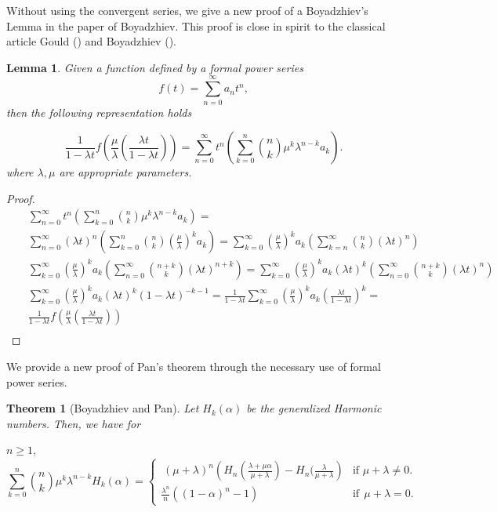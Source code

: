 \documentclass[a4paper,10pt,oneside]{article}
\newtheorem{lemma}{Lemma}[section]
\newtheorem{theorem}{Theorem}[section]
\theoremstyle{definition}
\theoremstyle{remark}
\begin{document}
 Without using the convergent series, we give a new proof of a Boyadzhiev's Lemma in the paper of  Boyadzhiev\cite{khristo3}. This proof is close in spirit to the classical article Gould (\cite{gould}) and   Boyadzhiev (\cite{khristo3}).\par
\begin{lemma}\label{lemma2pan}
Given a function defined by a formal power series
$$f(t)=\sum_{n=0}^{\infty}a_nt^n,$$
 then the following representation holds

\begin{equation}
\frac{1}{1-\lambda t}f\left(\frac{\mu}{\lambda}\left(\frac{\lambda t}{1-\lambda t}\right)\right)=\sum_{n=0}^{\infty}t^n\left( \sum_{k=0}^{n}
\binom{n}{k}{\mu}^k{\lambda}^{n-k}a_k\right).\label{panequa1}
\end{equation}
where $\lambda,\mu$ are appropriate parameters.
\end{lemma}
\begin{proof}
 \begin{eqnarray*}
  &&\sum_{n=0}^{\infty}t^n\left( \sum_{k=0}^{n}\binom{n}{k}{\mu}^k{\lambda}^{n-k}a_k\right)=\\
&&\sum_{n=0}^{\infty}(\lambda t)^n\left( \sum_{k=0}^{n}\binom{n}{k}(\frac{\mu}{\lambda})^ka_k\right)=
\sum_{k=0}^{\infty}(\frac{\mu}{\lambda})^ka_k\left( \sum_{k=n}^{\infty}
\binom{n}{k}(\lambda t)^n\right)\\
&&\sum_{k=0}^{\infty}(\frac{\mu}{\lambda})^ka_k\left( \sum_{n=0}^{\infty}
\binom{n+k}{k}(\lambda t)^{n+k}\right)=\sum_{k=0}^{\infty}(\frac{\mu}{\lambda})^ka_k(\lambda t)^k\left( \sum_{n=0}^{\infty}\binom{n+k}{k}(\lambda t)^{n}\right)\\
&&\sum_{k=0}^{\infty}(\frac{\mu}{\lambda})^ka_k(\lambda t)^k(1-\lambda t)^{-k-1}=\frac{1}{1-\lambda t}\sum_{k=0}^{\infty}(\frac{\mu}{\lambda})^ka_k\left(\frac{\lambda t}{1-\lambda t}\right)^k=\\
&&\frac{1}{1-\lambda t}f\left(\frac{\mu}{\lambda}\left(\frac{\lambda t}{1-\lambda t}\right)\right)\\
 \end{eqnarray*}
\end{proof}
We provide a new proof of Pan's theorem through the necessary use of formal power series.
\begin{theorem}[Boyadzhiev and Pan]\label{teorempan}
Let $H_k(\alpha)$ be the generalized Harmonic numbers. Then, we have for \par
  $n\geq1,$
$$ \sum_{k=0}^n\binom{n}{k}\mu^k\lambda^{n-k}H_{k}(\alpha)=\begin{cases}\ (\mu+\lambda)^n\left(H_n( \frac{\lambda+\mu\alpha}{\mu+\lambda})-H_n( \frac{\lambda}{\mu+\lambda}\right)&\text{if }\mu+\lambda\neq 0.\\

\frac{\lambda^n}{n}\left((1-\alpha)^{n}-1\right)& \text{if}\;\,\mu+\lambda=0.\end{cases} $$

\end{theorem}
\end{document}
